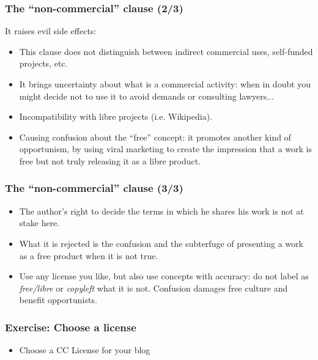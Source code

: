 
\begin{frame}
\frametitle{The ``non-commercial'' clause (2/3)}

It raises evil side effects: 
\begin{itemize}
\item This clause does not distinguish between indirect commercial uses, self-funded projects, etc.
\item It brings uncertainty about what is a commercial activity: when in doubt you might decide not to use it to avoid demands or consulting lawyers... 
\item Incompatibility with libre projects (i.e. Wikipedia).
\item Causing confusion about  the ``free'' concept: it promotes another kind of opportunism, by using viral marketing to create the impression that a work is free but not truly releasing it as a libre product.
\end{itemize}                                                 

\end{frame}


\begin{frame}
\frametitle{The ``non-commercial'' clause (3/3)}

\begin{itemize}
\item The author's right to decide the terms in which he shares his work is not at stake here.
\item What it is rejected is the confusion and the subterfuge of presenting a work as a free product when it is not true.
\item Use any license you like, but also use concepts with accuracy: do not label as \textit{free/libre} or \textit{copyleft} what it is not. Confusion damages free culture and benefit opportunists.
\end{itemize}
\end{frame}


\begin{frame}
\frametitle{Exercise: Choose a license}

\begin{itemize}
\item Choose a CC License for your blog
\end{itemize}
\end{frame}



